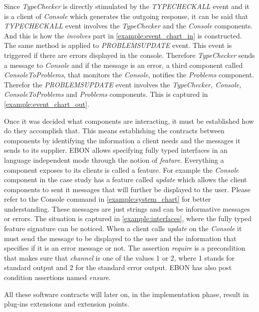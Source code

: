 \documentclass[conference]{IEEEtran}
\begin{document}
Since \emph{TypeChecker} is directly stimulated by the
\emph{TYPECHECKALL} event and it is a client of \emph{Console} which
generates the outgoing response, it can be said that\emph{
TYPECHECKALL} event involves the \emph{TypeChecker} and the
\emph{Console} components. And this is how the \emph{involves} part in
\autoref{example:event_chart_in} is constructed. The same method is
applied to \emph{PROBLEMSUPDATE} event. This event is triggered if
there are errors displayed in the console. Therefore
\emph{TypeChecker} sends a message to \emph{Console} and if the
message is an error, a third component called \emph{ConsoleToProblems},
that monitors the \emph{Console}, notifies the \emph{Problems}
component. Therefor the \emph{PROBLEMSUPDATE} event involves the
\emph{TypeChecker, Console, ConsoleToProblems} and \emph{Problems}
components. This is captured in \autoref{example:event_chart_out}.





Once it was decided what components are interacting, it must be
established how do they accomplish that. This means establishing the
contracts between components by identifying the information a client
needs and the messages it sends to its supplier. EBON allows
specifying fully typed interfaces in an language independent mode
through the notion of \emph{feature}. Everything a component exposes
to its clients is called a feature. For example the \emph{Console}
component in the case study has a feature called \emph{update} which
allows the client components to sent it messages that will further be
displayed to the user. Please refer to the Console command in
\autoref{example:system_chart} for better understanding. These
messages are just strings and can be informative messages or errors.
The situation is captured in \autoref{example:interfaces}, where the
fully typed feature signature can be noticed. When a client calls
\emph{update} on the \emph{Console} it must send the message to be
displayed to the user and the information that specifies if it is an
error message or not. The assertion \emph{require} is a precondition
that makes sure that \emph{channel} is one of the values 1 or 2, where
1 stands for standard output and 2 for the standard error output. EBON
has also post condition assertions named \emph{ensure}.

All these software contracts will later on, in the implementation phase,
result in plug-ins extensions and extension points.
\end{document}
